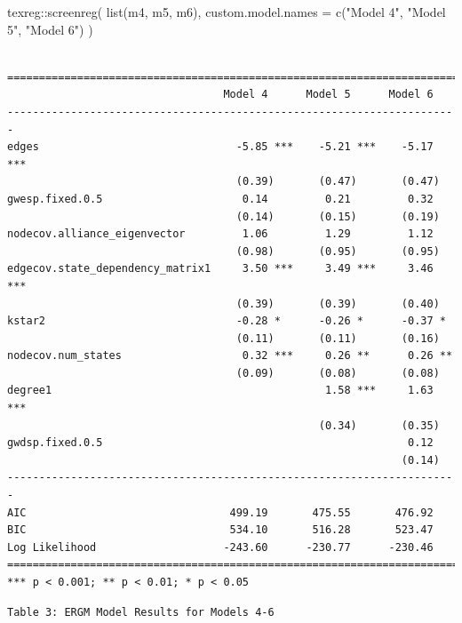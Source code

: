 \documentclass[
]{article}
\newenvironment{Shaded}{\begin{snugshade}}{\end{snugshade}}
\newcommand{\AttributeTok}[1]{\textcolor[rgb]{0.40,0.45,0.13}{#1}}
\newcommand{\FunctionTok}[1]{\textcolor[rgb]{0.28,0.35,0.67}{#1}}
\newcommand{\NormalTok}[1]{\textcolor[rgb]{0.00,0.23,0.31}{#1}}
\newcommand{\SpecialCharTok}[1]{\textcolor[rgb]{0.37,0.37,0.37}{#1}}
\newcommand{\StringTok}[1]{\textcolor[rgb]{0.13,0.47,0.30}{#1}}
\begin{document}
\begin{Shaded}
\begin{Highlighting}[]
\NormalTok{texreg}\SpecialCharTok{::}\FunctionTok{screenreg}\NormalTok{(}
  \FunctionTok{list}\NormalTok{(m4, m5, m6),}
  \AttributeTok{custom.model.names =} \FunctionTok{c}\NormalTok{(}\StringTok{"Model 4"}\NormalTok{, }\StringTok{"Model 5"}\NormalTok{, }\StringTok{"Model 6"}\NormalTok{)}
\NormalTok{)}
\end{Highlighting}
\end{Shaded}

\begin{verbatim}

=======================================================================
                                  Model 4      Model 5      Model 6    
-----------------------------------------------------------------------
edges                               -5.85 ***    -5.21 ***    -5.17 ***
                                    (0.39)       (0.47)       (0.47)   
gwesp.fixed.0.5                      0.14         0.21         0.32    
                                    (0.14)       (0.15)       (0.19)   
nodecov.alliance_eigenvector         1.06         1.29         1.12    
                                    (0.98)       (0.95)       (0.95)   
edgecov.state_dependency_matrix1     3.50 ***     3.49 ***     3.46 ***
                                    (0.39)       (0.39)       (0.40)   
kstar2                              -0.28 *      -0.26 *      -0.37 *  
                                    (0.11)       (0.11)       (0.16)   
nodecov.num_states                   0.32 ***     0.26 **      0.26 ** 
                                    (0.09)       (0.08)       (0.08)   
degree1                                           1.58 ***     1.63 ***
                                                 (0.34)       (0.35)   
gwdsp.fixed.0.5                                                0.12    
                                                              (0.14)   
-----------------------------------------------------------------------
AIC                                499.19       475.55       476.92    
BIC                                534.10       516.28       523.47    
Log Likelihood                    -243.60      -230.77      -230.46    
=======================================================================
*** p < 0.001; ** p < 0.01; * p < 0.05
\end{verbatim}

\begin{verbatim}
Table 3: ERGM Model Results for Models 4-6
\end{verbatim}
\end{document}
